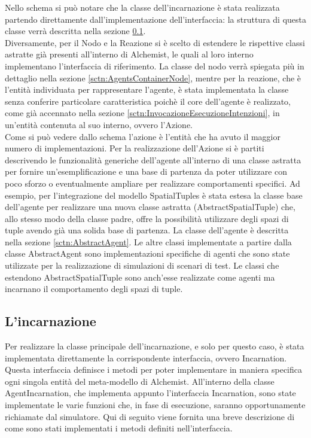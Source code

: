 Nello schema si può notare che la classe dell'incarnazione è stata realizzata partendo direttamente dall'implementazione dell'interfaccia: la struttura di questa classe verrà descritta nella sezione \ref{sctn:AgentIncarnation}.
\\
Diversamente, per il Nodo e la Reazione si è scelto di estendere le rispettive classi astratte già presenti all'interno di Alchemist, le quali al loro interno implementano l'interfaccia di riferimento. La classe del nodo verrà spiegata più in dettaglio nella sezione \ref{sctn:AgentsContainerNode}, mentre per la reazione, che è l'entità individuata per rappresentare l'agente, è stata implementata la classe senza conferire particolare caratteristica poichè il core dell'agente è realizzato, come già accennato nella sezione \ref{sctn:InvocazioneEsecuzioneIntenzioni}, in un'entità contenuta al suo interno, ovvero l'Azione.
\\
Come si può vedere dallo schema l'azione è l'entità che ha avuto il maggior numero di implementazioni. Per la realizzazione dell'Azione si è partiti descrivendo le funzionalità generiche dell'agente all'interno di una classe astratta per fornire un'esemplificazione e una base di partenza da poter utilizzare con poco sforzo o eventualmente ampliare per realizzare comportamenti specifici.
Ad esempio, per l'integrazione del modello SpatialTuples è stata estesa la classe base dell'agente per realizzare una nuova classe astratta (AbstractSpatialTuple) che, allo stesso modo della classe padre, offre la possibilità utilizzare degli spazi di tuple avendo già una solida base di partenza. La classe dell'agente è descritta nella sezione \ref{sctn:AbstractAgent}. Le altre classi implementate a partire dalla classe AbstractAgent sono implementazioni specifiche di agenti che sono state utilizzate per la realizzazione di simulazioni di scenari di test. Le classi che estendono AbstractSpatialTuple sono anch'esse realizzate come agenti ma incarnano il comportamento degli spazi di tuple.

\subsection{L'incarnazione}\label{sctn:AgentIncarnation}
Per realizzare la classe principale dell'incarnazione, e solo per questo caso, è stata implementata direttamente la corrispondente interfaccia, ovvero Incarnation. Questa interfaccia definisce i metodi per poter implementare in maniera specifica ogni singola entità del meta-modello di Alchemist. All'interno della classe AgentIncarnation, che implementa appunto l'interfaccia Incarnation, sono state implementate le varie funzioni che, in fase di esecuzione, saranno opportunamente richiamate dal simulatore. Qui di seguito viene fornita una breve descrizione di come sono stati implementati i metodi definiti nell'interfaccia.

